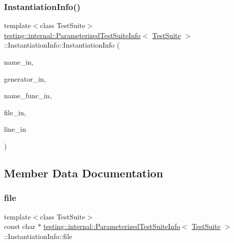 \subsubsection{\texorpdfstring{InstantiationInfo()}{InstantiationInfo()}\hspace{0.1cm}{\footnotesize\ttfamily [2/2]}}
{\footnotesize\ttfamily template$<$class Test\+Suite$>$ \\
\mbox{\hyperlink{classtesting_1_1internal_1_1_parameterized_test_suite_info}{testing\+::internal\+::\+Parameterized\+Test\+Suite\+Info}}$<$ \mbox{\hyperlink{classtesting_1_1_test_suite}{Test\+Suite}} $>$\+::Instantiation\+Info\+::\+Instantiation\+Info (\begin{DoxyParamCaption}\item[{const std\+::string \&}]{name\+\_\+in,  }\item[{Generator\+Creation\+Func $\ast$}]{generator\+\_\+in,  }\item[{\mbox{\hyperlink{classtesting_1_1internal_1_1_parameterized_test_suite_info_a3b4f232b7d6d3df941bb8e81b6b534a4}{Param\+Name\+Generator\+Func}} $\ast$}]{name\+\_\+func\+\_\+in,  }\item[{const char $\ast$}]{file\+\_\+in,  }\item[{int}]{line\+\_\+in }\end{DoxyParamCaption})\hspace{0.3cm}{\ttfamily [inline]}}



\subsection{Member Data Documentation}
\mbox{\label{structtesting_1_1internal_1_1_parameterized_test_suite_info_1_1_instantiation_info_ae38ea7cbde34927ddd172a67d7fae19b}} 
\subsubsection{\texorpdfstring{file}{file}}
{\footnotesize\ttfamily template$<$class Test\+Suite$>$ \\
const char $\ast$ \mbox{\hyperlink{classtesting_1_1internal_1_1_parameterized_test_suite_info}{testing\+::internal\+::\+Parameterized\+Test\+Suite\+Info}}$<$ \mbox{\hyperlink{classtesting_1_1_test_suite}{Test\+Suite}} $>$\+::Instantiation\+Info\+::file}

